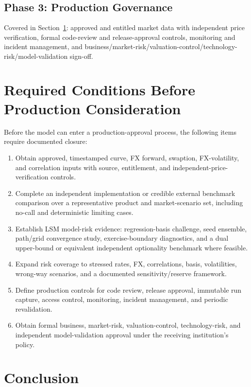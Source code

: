 \documentclass[conference]{IEEEtran}
\begin{document}
\subsection{Phase 3: Production Governance}
Covered in Section~\ref{sec:conditions}: approved and entitled market data with independent price verification, formal code-review and release-approval controls, monitoring and incident management, and business/market-risk/valuation-control/technology-risk/model-validation sign-off.

\section{Required Conditions Before Production Consideration}
\label{sec:conditions}

Before the model can enter a production-approval process, the following items require documented closure:
\begin{enumerate}
  \item Obtain approved, timestamped curve, FX forward, swaption, FX-volatility, and correlation inputs with source, entitlement, and independent-price-verification controls.
  \item Complete an independent implementation or credible external benchmark comparison over a representative product and market-scenario set, including no-call and deterministic limiting cases.
  \item Establish LSM model-risk evidence: regression-basis challenge, seed ensemble, path/grid convergence study, exercise-boundary diagnostics, and a dual upper-bound or equivalent independent optionality benchmark where feasible.
  \item Expand risk coverage to stressed rates, FX, correlations, basis, volatilities, wrong-way scenarios, and a documented sensitivity/reserve framework.
  \item Define production controls for code review, release approval, immutable run capture, access control, monitoring, incident management, and periodic revalidation.
  \item Obtain formal business, market-risk, valuation-control, technology-risk, and independent model-validation approval under the receiving institution's policy.
\end{enumerate}

\section{Conclusion}
\end{document}
